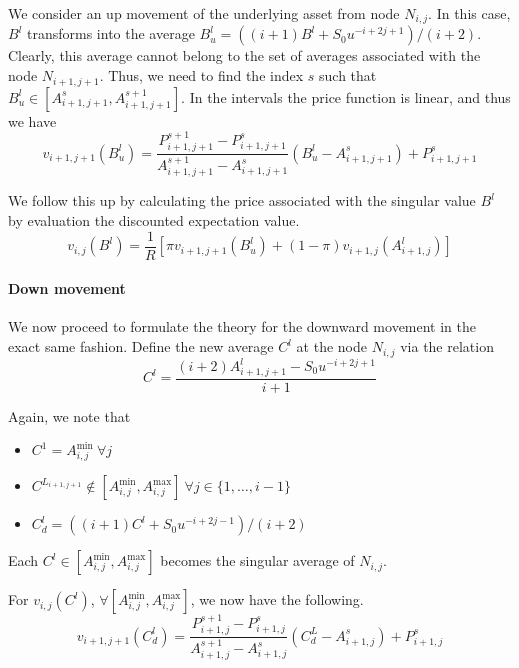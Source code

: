 We consider an up movement of the underlying asset from node $ N_{i,j} $. In this case, $ B^l $ transforms into the average $ B^l_u = \left( (i+1) B^l + S_0 u^{-i+2j+1} \right) / ( i+2 ) $. Clearly, this average cannot belong to the set of averages associated with the node $ N_{i+1,j+1} $. Thus, we need to find the index $s$ such that $ B^l_u \in \left[ A_{i+1,j+1}^{s} , A_{i+1,j+1}^{s+1} \right] $. In the intervals the price function is linear, and thus we have
\begin{equation}
	\label{eq:sp-asian-up-lint}
	v_{i+1,j+1} \left( B^l_u \right) = \frac{ P_{i+1,j+1}^{s+1} - P_{i+1,j+1}^{s} }{ A_{i+1,j+1}^{s+1} - A_{i+1,j+1}^{s} } \left( B^l_u - A_{i+1,j+1}^{s} \right) + P_{i+1,j+1}^{s}
\end{equation}

We follow this up by calculating the price associated with the singular value $ B^l $ by evaluation the discounted expectation value.
\begin{equation}
	\label{eq:sp-asian-up-pr}
	v_{i,j}( B^l ) = \frac{1}{R} \left[ \pi v_{i+1,j+1} \left( B^l_u \right) + (1 - \pi) v_{i+1,j} \left( A_{i+1,j}^l \right) \right]
\end{equation}


\paragraph{Down movement}

We now proceed to formulate the theory for the downward movement in the exact same fashion. Define the new average $ C^l $ at the node $ N_{i,j} $ via the relation
\begin{equation}
	\label{eq:sp-asian-proj-dn}
	C^l = \frac{ ( i+2) A_{i+1,j+1}^l - S_0 u^{-i+2j+1} }{ i+1 }
\end{equation}

Again, we note that
\begin{itemize}
\item $ C^1 = A_{i,j}^{\min} \ \forall j $
\item $ C^{L_{i+1,j+1}} \notin \left[ A_{i,j}^{\min}, A_{i,j}^{\max} \right] \ \forall j \in \{1, \dots, i-1 \} $
\item $ C^l_d = \left( (i+1) C^l + S_0 u^{-i+2j-1} \right) / ( i+2 ) $
\end{itemize}
Each $ C^l \in \left[ A_{i,j}^{\min}, A_{i,j}^{\max} \right] $ becomes the singular average of $ N_{i,j} $.

For $ v_{i,j}( C^l ) $, $ \forall \left[ A_{i,j}^{\min}, A_{i,j}^{\max} \right] $, we now have the following.
\begin{equation}
	\label{eq:sp-asian-dn-lint}
	v_{i+1,j+1} \left( C^l_d \right) = \frac{ P_{i+1,j}^{s+1} - P_{i+1,j}^{s} }{ A_{i+1,j}^{s+1} - A_{i+1,j}^{s} } \left( C^L_d - A_{i+1,j}^{s} \right) + P_{i+1,j}^{s}
\end{equation}

